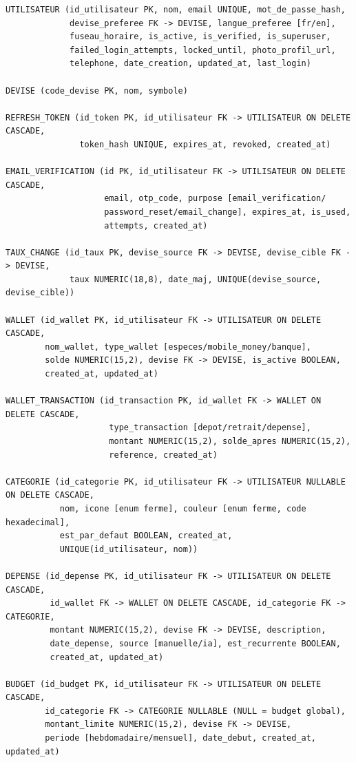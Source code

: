 \documentclass[11pt,a4paper]{article}
\begin{document}
\begin{lstlisting}
UTILISATEUR (id_utilisateur PK, nom, email UNIQUE, mot_de_passe_hash,
             devise_preferee FK -> DEVISE, langue_preferee [fr/en],
             fuseau_horaire, is_active, is_verified, is_superuser,
             failed_login_attempts, locked_until, photo_profil_url,
             telephone, date_creation, updated_at, last_login)

DEVISE (code_devise PK, nom, symbole)

REFRESH_TOKEN (id_token PK, id_utilisateur FK -> UTILISATEUR ON DELETE CASCADE,
               token_hash UNIQUE, expires_at, revoked, created_at)

EMAIL_VERIFICATION (id PK, id_utilisateur FK -> UTILISATEUR ON DELETE CASCADE,
                    email, otp_code, purpose [email_verification/
                    password_reset/email_change], expires_at, is_used,
                    attempts, created_at)

TAUX_CHANGE (id_taux PK, devise_source FK -> DEVISE, devise_cible FK -> DEVISE,
             taux NUMERIC(18,8), date_maj, UNIQUE(devise_source, devise_cible))

WALLET (id_wallet PK, id_utilisateur FK -> UTILISATEUR ON DELETE CASCADE,
        nom_wallet, type_wallet [especes/mobile_money/banque],
        solde NUMERIC(15,2), devise FK -> DEVISE, is_active BOOLEAN,
        created_at, updated_at)

WALLET_TRANSACTION (id_transaction PK, id_wallet FK -> WALLET ON DELETE CASCADE,
                     type_transaction [depot/retrait/depense],
                     montant NUMERIC(15,2), solde_apres NUMERIC(15,2),
                     reference, created_at)

CATEGORIE (id_categorie PK, id_utilisateur FK -> UTILISATEUR NULLABLE ON DELETE CASCADE,
           nom, icone [enum ferme], couleur [enum ferme, code hexadecimal],
           est_par_defaut BOOLEAN, created_at,
           UNIQUE(id_utilisateur, nom))

DEPENSE (id_depense PK, id_utilisateur FK -> UTILISATEUR ON DELETE CASCADE,
         id_wallet FK -> WALLET ON DELETE CASCADE, id_categorie FK -> CATEGORIE,
         montant NUMERIC(15,2), devise FK -> DEVISE, description,
         date_depense, source [manuelle/ia], est_recurrente BOOLEAN,
         created_at, updated_at)

BUDGET (id_budget PK, id_utilisateur FK -> UTILISATEUR ON DELETE CASCADE,
        id_categorie FK -> CATEGORIE NULLABLE (NULL = budget global),
        montant_limite NUMERIC(15,2), devise FK -> DEVISE,
        periode [hebdomadaire/mensuel], date_debut, created_at, updated_at)


\end{lstlisting}
\end{document}
